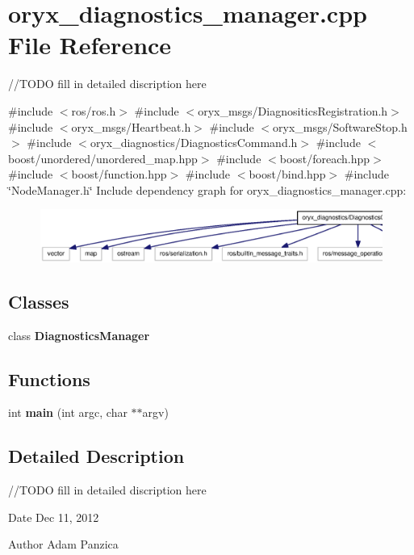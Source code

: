 \section{oryx\-\_\-diagnostics\-\_\-manager.\-cpp \-File \-Reference}
\label{oryx__diagnostics__manager_8cpp}


//\-T\-O\-D\-O fill in detailed discription here  


{\ttfamily \#include $<$ros/ros.\-h$>$}\*
{\ttfamily \#include $<$oryx\-\_\-msgs/\-Diagnositics\-Registration.\-h$>$}\*
{\ttfamily \#include $<$oryx\-\_\-msgs/\-Heartbeat.\-h$>$}\*
{\ttfamily \#include $<$oryx\-\_\-msgs/\-Software\-Stop.\-h$>$}\*
{\ttfamily \#include $<$oryx\-\_\-diagnostics/\-Diagnostics\-Command.\-h$>$}\*
{\ttfamily \#include $<$boost/unordered/unordered\-\_\-map.\-hpp$>$}\*
{\ttfamily \#include $<$boost/foreach.\-hpp$>$}\*
{\ttfamily \#include $<$boost/function.\-hpp$>$}\*
{\ttfamily \#include $<$boost/bind.\-hpp$>$}\*
{\ttfamily \#include \char`\"{}\-Node\-Manager.\-h\char`\"{}}\*
\-Include dependency graph for oryx\-\_\-diagnostics\-\_\-manager.\-cpp\-:
\nopagebreak
\begin{figure}[H]
\begin{center}
\leavevmode
\includegraphics[width=350pt]{oryx__diagnostics__manager_8cpp__incl}
\end{center}
\end{figure}
\subsection*{\-Classes}
\begin{DoxyCompactItemize}
\item 
class {\bf \-Diagnostics\-Manager}
\end{DoxyCompactItemize}
\subsection*{\-Functions}
\begin{DoxyCompactItemize}
\item 
int {\bf main} (int argc, char $\ast$$\ast$argv)
\end{DoxyCompactItemize}


\subsection{\-Detailed \-Description}
//\-T\-O\-D\-O fill in detailed discription here \begin{DoxyDate}{\-Date}
\-Dec 11, 2012 
\end{DoxyDate}
\begin{DoxyAuthor}{\-Author}
\-Adam \-Panzica 
\end{DoxyAuthor}



